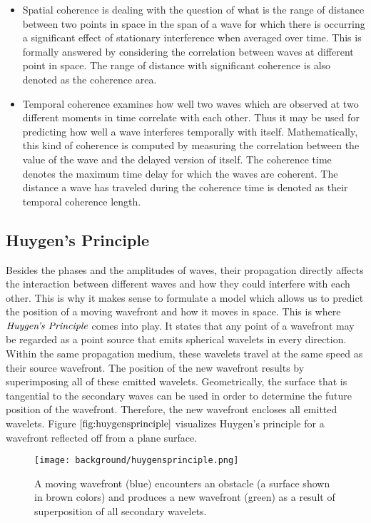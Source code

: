 \begin{itemize}
  \item Spatial coherence is dealing with the question of what is the range of distance between two points in space in the span of a wave for which there is occurring a significant effect of stationary interference when averaged over time. This is formally answered by considering the correlation between waves at different point in space. The range of distance with significant coherence is also denoted as the coherence area.
  \item Temporal coherence examines how well two waves which are observed at two different moments in time correlate with each other. Thus it may be used for predicting how well a wave interferes temporally with itself. Mathematically, this kind of coherence is computed by measuring the correlation between the value of the wave and the delayed version of itself. The coherence time denotes the maximum time delay for which the waves are coherent. The distance a wave has traveled during the coherence time is denoted as their temporal coherence length.
\end{itemize}

\subsection{Huygen's Principle}
\label{sec:huygensprincipledef}
Besides the phases and the amplitudes of waves, their propagation directly affects the interaction between different waves and how they could interfere with each other. This is why it makes sense to formulate a model which allows us to predict the position of a moving wavefront and how it moves in space. This is where $\emph{Huygen's Principle}$ comes into play. It states that any point of a wavefront may be regarded as a point source that emits spherical wavelets in every direction. Within the same propagation medium, these wavelets travel at the same speed as their source wavefront. The position of the new wavefront results by superimposing all of these emitted wavelets. Geometrically, the surface that is tangential to the secondary waves can be used in order to determine the future position of the wavefront. Therefore, the new wavefront encloses all emitted wavelets. Figure $\ref{fig:huygensprinciple}$ visualizes Huygen's principle for a wavefront reflected off from a plane surface.

\begin{figure}[H]
  \centering
  \texttt{[image: background/huygensprinciple.png]}
  \caption[Huygen's Principle]{A moving wavefront (blue) encounters an obstacle (a surface shown in brown colors) and produces a new wavefront (green) as a result of superposition of all secondary wavelets.}
  \label{fig:huygensprinciple}
\end{figure}


